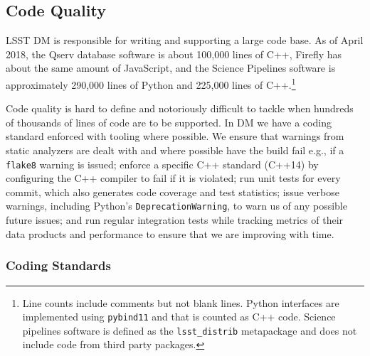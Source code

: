 \subsection{Code Quality}

LSST DM is responsible for writing and supporting a large code base.
As of April 2018, the Qserv database software\cite{2011Wang:2011:QDS:2063348.2063364} is about 100,000 lines of C++, Firefly has about the same amount of JavaScript\cite{2016SPIE.9913E..0YR}, and the Science Pipelines software\cite{2018PASJ...70S...5B} is approximately 290,000 lines of Python and 225,000 lines of C++.\footnote{Line counts include comments but not blank lines. Python interfaces are implemented using \texttt{pybind11} and that is counted as C++ code. Science pipelines software is defined as the \texttt{lsst\_distrib} metapackage and does not include code from third party packages.}

%

\noindent Code quality is hard to define and notoriously difficult to tackle when hundreds of thousands of lines of code are to be supported.
In DM we have a coding standard\cite{devguide} enforced with tooling where possible.
We ensure  that warnings from static analyzers are dealt with and where possible have the build fail e.g., if a \texttt{flake8} warning is issued;
enforce a specific C++ standard (C++14) by configuring the C++ compiler to fail if it is violated;
run unit tests for every commit, which also generates code coverage and test statistics;
issue verbose warnings, including Python's \texttt{DeprecationWarning}, to warn us of any possible future issues;
and run regular integration tests while tracking metrics of their data products and performance to ensure that we are improving with time.

\subsubsection{Coding Standards}
\label{sec:coding-standards}

